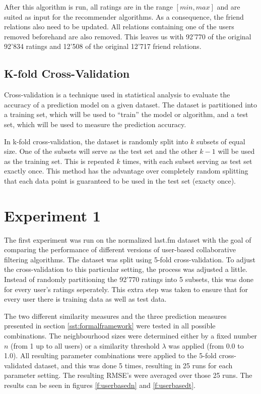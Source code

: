 After this algorithm is run, all ratings are in the range $[min,max]$ and are suited as input for the recommender algorithms. As a consequence, the friend relations also need to be updated. All relations containing one of the users removed beforehand are also removed. This leaves us with 92'770 of the original 92'834 ratings and 12'508 of the original 12'717 friend relations.

\subsection{K-fold Cross-Validation}
\label{sst:kfoldcrossvalidation} Cross-validation is a technique used in statistical analysis to evaluate the accuracy of a prediction model on a given dataset. The dataset is partitioned into a training set, which will be used to ``train'' the model or algorithm, and a test set, which will be used to measure the prediction accuracy.

In k-fold cross-validation, the dataset is randomly split into $k$ subsets of equal size. One of the subsets will serve as the test set and the other $k-1$ will be used as the training set. This is repeated $k$ times, with each subset serving as test set exactly once. This method has the advantage over completely random splitting that each data point is guaranteed to be used in the test set (exacty once).
\section{Experiment 1}
\label{st:experiment1} The first experiment was run on the normalized last.fm dataset with the goal of comparing the performance of different versions of user-based collaborative filtering algorithms. The dataset was split using 5-fold cross-validation. To adjust the cross-validation to this particular setting, the process was adjusted a little. Instead of randomly partitioning the 92'770 ratings into 5 subsets, this was done for every user's ratings seperately. This extra step was taken to ensure that for every user there is training data as well as test data.

The two different similarity measures and the three prediction measures presented in section \ref{sst:formalframework} were tested in all possible combinations. The neighbourhood sizes were determined either by a fixed number $n$ (from 1 up to all users) or a similarity threshold $\lambda$ was applied (from 0.0 to 1.0). All resulting parameter combinations were applied to the 5-fold cross-validated dataset, and this was done 5 times, resulting in 25 runs for each parameter setting. The resulting RMSE's were averaged over those 25 runs. The results can be seen in figures \ref{f:userbasedn} and \ref{f:userbasedt}.

